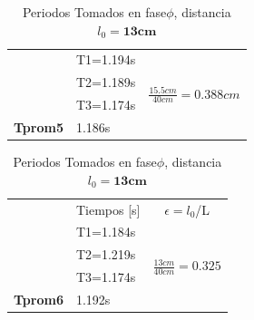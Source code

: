 \documentclass{article}
\begin{document}
\begin{table}[H]
\begin{subtable}{.5\linewidth}
\begin{tabular}{@{}l|l|l|@{}}
                      & T1=1.194s                        & \multirow{4}{*}{$\frac{15.5cm}{40cm}=0.388cm$} \\ \cmidrule(lr){2-2}
                      & T2=1.189s                        &                                \\ \cmidrule(lr){2-2}
                      & T3=1.174s                        &                                \\ \cmidrule(lr){2-2}
\textbf{Tprom5}   	  & 1.186s                           &                                \\ \cmidrule(l){2-3} 
\end{tabular}
\caption{Periodos Tomados en fase$\phi$, distancia $l_{0}=\textbf{15.5cm}$}
\label{fase1-5}
    \end{subtable}%
    \begin{subtable}{.8\linewidth}
      \centering
        \begin{tabular}{@{}l|l|l|@{}}
		\cmidrule(l){2-3}
\multicolumn{1}{c|}{} & \multicolumn{1}{c|}{Tiempos [s]} & \multicolumn{1}{c|}{$\epsilon=l_{0}$/L}       \\ \cmidrule(l){2-3} 
                      & T1=1.184s                        & \multirow{4}{*}{$\frac{13cm}{40cm}=0.325$}  \\ \cmidrule(lr){2-2}
                      & T2=1.219s                        &                                                 \\ \cmidrule(lr){2-2}
                      & T3=1.174s                        &                                  				 \\ \cmidrule(lr){2-2}
	\textbf{Tprom6}   & 1.192s                           &               				                      \\ \cmidrule(l){2-3} 
\end{tabular}
\caption{Periodos Tomados en fase$\phi$, distancia $l_{0}=\textbf{13cm}$}
\label{fase1-6}
 \end{subtable} 
   

\end{table}
\end{document}
